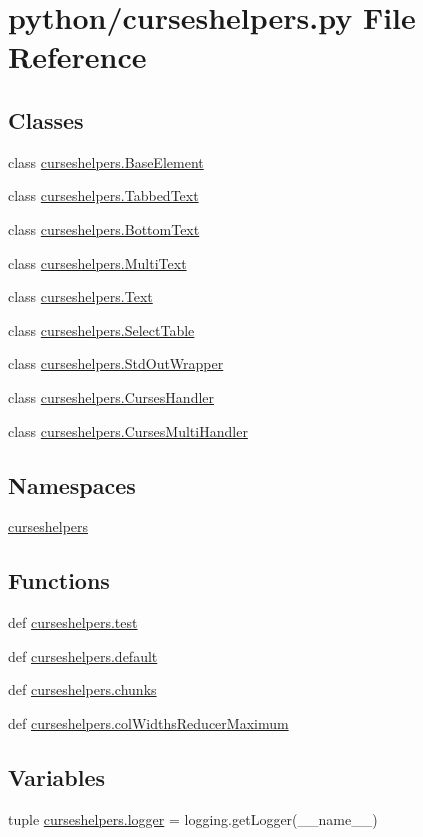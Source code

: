 \section{python/curseshelpers.py File Reference}
\label{curseshelpers_8py}
\subsection*{Classes}
\begin{DoxyCompactItemize}
\item 
class \hyperlink{classcurseshelpers_1_1BaseElement}{curseshelpers.\-Base\-Element}
\item 
class \hyperlink{classcurseshelpers_1_1TabbedText}{curseshelpers.\-Tabbed\-Text}
\item 
class \hyperlink{classcurseshelpers_1_1BottomText}{curseshelpers.\-Bottom\-Text}
\item 
class \hyperlink{classcurseshelpers_1_1MultiText}{curseshelpers.\-Multi\-Text}
\item 
class \hyperlink{classcurseshelpers_1_1Text}{curseshelpers.\-Text}
\item 
class \hyperlink{classcurseshelpers_1_1SelectTable}{curseshelpers.\-Select\-Table}
\item 
class \hyperlink{classcurseshelpers_1_1StdOutWrapper}{curseshelpers.\-Std\-Out\-Wrapper}
\item 
class \hyperlink{classcurseshelpers_1_1CursesHandler}{curseshelpers.\-Curses\-Handler}
\item 
class \hyperlink{classcurseshelpers_1_1CursesMultiHandler}{curseshelpers.\-Curses\-Multi\-Handler}
\end{DoxyCompactItemize}
\subsection*{Namespaces}
\begin{DoxyCompactItemize}
\item 
\hyperlink{namespacecurseshelpers}{curseshelpers}
\end{DoxyCompactItemize}
\subsection*{Functions}
\begin{DoxyCompactItemize}
\item 
def \hyperlink{namespacecurseshelpers_a733634be840be3023b0841ba9c447101}{curseshelpers.\-test}
\item 
def \hyperlink{namespacecurseshelpers_a51ef335e2c1e619dbc69a80c2a78bef7}{curseshelpers.\-default}
\item 
def \hyperlink{namespacecurseshelpers_ad5e4852e2c0a0159d740761730dbcb85}{curseshelpers.\-chunks}
\item 
def \hyperlink{namespacecurseshelpers_ad3ed6836b3f87f95b7bb1ee2fb25e99f}{curseshelpers.\-col\-Widths\-Reducer\-Maximum}
\end{DoxyCompactItemize}
\subsection*{Variables}
\begin{DoxyCompactItemize}
\item 
tuple \hyperlink{namespacecurseshelpers_afb5883585b25af527c1f446a6ee188a1}{curseshelpers.\-logger} = logging.\-get\-Logger(\-\_\-\-\_\-name\-\_\-\-\_\-)
\end{DoxyCompactItemize}
